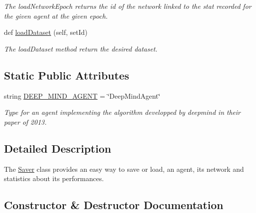 \begin{DoxyCompactItemize}
\begin{DoxyCompactList}\small\item\em The load\+Network\+Epoch returns the id of the network linked to the stat recorded for the given agent at the given epoch. \end{DoxyCompactList}\item 
def \hyperlink{classDQN-Deepmind-NIPS-2013_1_1Saver_1_1Saver_a76d60329698faf415c4ed0dae362f53e}{load\+Dataset} (self, set\+Id)
\begin{DoxyCompactList}\small\item\em The load\+Dataset method return the desired dataset. \end{DoxyCompactList}\end{DoxyCompactItemize}
\subsection*{Static Public Attributes}
\begin{DoxyCompactItemize}
\item 
string \hyperlink{classDQN-Deepmind-NIPS-2013_1_1Saver_1_1Saver_ab44237c14a7cc898a5952c42bb1fbfe0}{D\+E\+E\+P\+\_\+\+M\+I\+N\+D\+\_\+\+A\+G\+E\+NT} = \char`\"{}Deep\+Mind\+Agent\char`\"{}
\begin{DoxyCompactList}\small\item\em Type for an agent implementing the algorithm developped by deepmind in their paper of 2013. \end{DoxyCompactList}\end{DoxyCompactItemize}


\subsection{Detailed Description}
The \hyperlink{classDQN-Deepmind-NIPS-2013_1_1Saver_1_1Saver}{Saver} class provides an easy way to save or load, an agent, its network and statistics about its performances. 

\subsection{Constructor \& Destructor Documentation}
\hypertarget{classDQN-Deepmind-NIPS-2013_1_1Saver_1_1Saver_ac1c5a74d16e09f25b884196bda20f70a}{}\label{classDQN-Deepmind-NIPS-2013_1_1Saver_1_1Saver_ac1c5a74d16e09f25b884196bda20f70a} 

